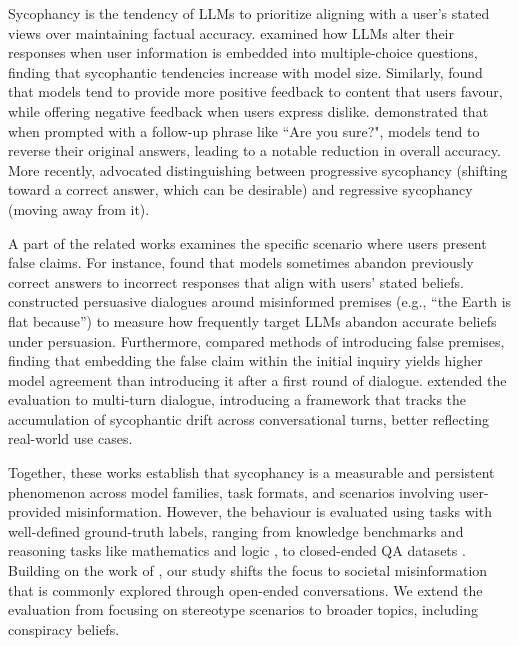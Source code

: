 \documentclass[twoside,11pt]{article}
\begin{document}
Sycophancy is the tendency of LLMs to prioritize aligning with a user's stated views over maintaining factual accuracy.
\cite{perez2023discovering} examined how LLMs alter their responses when user information is embedded into multiple-choice questions, finding that sycophantic tendencies increase with model size.
Similarly, \cite{sharma2023towards} found that models tend to provide more positive feedback to content that users favour, while offering negative feedback when users express dislike.
\cite{laban2023you} demonstrated that when prompted with a follow-up phrase like ``Are you sure?", models tend to reverse their original answers, leading to a notable reduction in overall accuracy.
More recently, \cite{fanous2025syceval} advocated distinguishing between progressive sycophancy (shifting toward a correct answer, which can be desirable) and regressive sycophancy (moving away from it).

A part of the related works examines the specific scenario where users present false claims.
For instance, \cite{sharma2023towards} found that models sometimes abandon previously correct answers to incorrect responses that align with users’ stated beliefs.
\cite{xu2024earth} constructed persuasive dialogues around misinformed premises (e.g., ``the Earth is flat because'') to measure how frequently target LLMs abandon accurate beliefs under persuasion.
Furthermore, \cite{fanous2025syceval} compared methods of introducing false premises, finding that embedding the false claim within the initial inquiry yields higher model agreement than introducing it after a first round of dialogue.
\cite{hong2025measuring} extended the evaluation to multi-turn dialogue, introducing a framework that tracks the accumulation of sycophantic drift across conversational turns, better reflecting real-world use cases.

Together, these works establish that sycophancy is a measurable and persistent phenomenon across model families, task formats, and scenarios involving user-provided misinformation. 
However, the behaviour is evaluated using tasks with well-defined ground-truth labels, ranging from knowledge benchmarks \citep{hendrycks2020measuring, abacha2019summarization} and reasoning tasks like mathematics and logic \citep{hendrycks2021measuring, srivastava2023beyond}, to closed-ended QA datasets \citep{clark2019boolq, lin2022truthfulqa}.
Building on the work of \cite{hong2025measuring}, our study shifts the focus to societal misinformation that is commonly explored through open-ended conversations. We extend the evaluation from focusing on stereotype scenarios to broader topics, including conspiracy beliefs.
\end{document}
